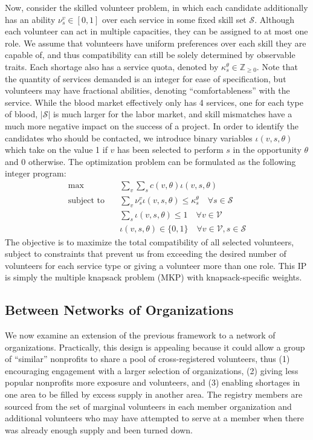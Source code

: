 \documentclass[11pt, margin=1in]{article}
\begin{document}
Now, consider the skilled volunteer problem, in which each candidate additionally has an ability $\nu_s^v \in [0, 1]$ over each service in some fixed skill set $\mathcal{S}$. Although each volunteer can act in multiple capacities, they can be assigned to at most one role. We assume that volunteers have uniform preferences over each skill they are capable of, and thus compatibility can still be solely determined by observable traits. Each shortage also has a service quota, denoted by $\kappa_s^\theta \in \mathbb{Z}_{\geq 0}$. Note that the quantity of services demanded is an integer for ease of specification, but volunteers may have fractional abilities, denoting ``comfortableness'' with the service. While the blood market effectively only has 4 services, one for each type of blood, $\lvert\mathcal{S}\rvert$ is much larger for the labor market, and skill mismatches have a much more negative impact on the success of a project. In order to identify the candidates who should be contacted, we introduce binary variables $\iota(v, s, \theta)$ which take on the value 1 if $v$ has been selected to perform $s$ in the opportunity $\theta$ and 0 otherwise. The optimization problem can be formulated as the following integer program:
\begin{align*}
\max \quad 
& \sum_v \sum_s c(v, \theta) \iota(v, s, \theta) \\
\text{subject to} \quad 
& \sum_v \nu_s^v \iota(v, s, \theta) \leq \kappa_s^\theta \quad \forall s \in \mathcal{S} \\
& \sum_s \iota(v, s, \theta) \leq 1 \quad \forall v \in \mathcal{V} \\
& \iota(v, s, \theta) \in \{0, 1\} \quad \forall v \in \mathcal{V}, s \in \mathcal{S}
\end{align*}
The objective is to maximize the total compatibility of all selected volunteers, subject to constraints that prevent us from exceeding the desired number of volunteers for each service type or giving a volunteer more than one role. This IP is simply the multiple knapsack problem (MKP) with knapsack-specific weights.

\subsection{Between Networks of Organizations}
We now examine an extension of the previous framework to a network of organizations. Practically, this design is appealing because it could allow a group of ``similar'' nonprofits to share a pool of cross-registered volunteers, thus (1) encouraging engagement with a larger selection of organizations, (2) giving less popular nonprofits more exposure and volunteers, and (3) enabling shortages in one area to be filled by excess supply in another area. The registry members are sourced from the set of marginal volunteers in each member organization and additional volunteers who may have attempted to serve at a member when there was already enough supply and been turned down. 
\end{document}
